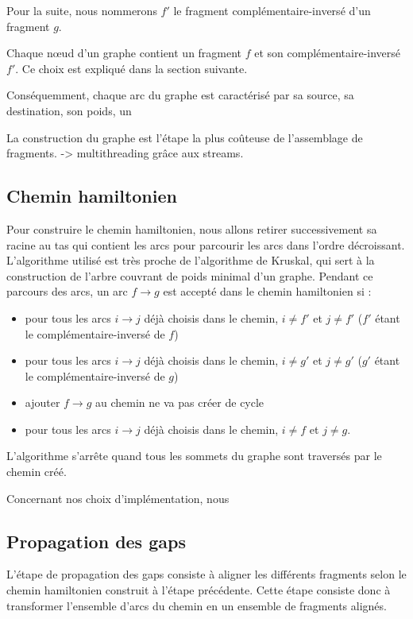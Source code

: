 \documentclass{article}
\begin{document}
Pour la suite, nous nommerons $f'$ le fragment complémentaire-inversé d'un fragment $g$. 

Chaque nœud d'un graphe contient un fragment $f$ et son complémentaire-inversé $f'$. Ce choix est expliqué dans la section suivante.

Conséquemment, chaque arc du graphe est caractérisé par sa source, sa destination, son poids, un

La construction du graphe est l'étape la plus coûteuse de l'assemblage de fragments. -> multithreading grâce aux streams.



\subsection{Chemin hamiltonien}

Pour construire le chemin hamiltonien, nous allons retirer successivement sa racine au tas qui contient les arcs pour parcourir les arcs dans l'ordre décroissant. L'algorithme utilisé est très proche de l'algorithme de Kruskal, qui sert à la construction de l'arbre couvrant de poids minimal d'un graphe.
Pendant ce parcours des arcs, un arc $f \to g$ est accepté dans le chemin hamiltonien si :

\begin{itemize}
\item pour tous les arcs $i \to j$ déjà choisis dans le chemin, $i \neq f'$ et $j \neq f'$  ($f'$ étant le complémentaire-inversé de $f$)
\item pour tous les arcs $i \to j$ déjà choisis dans le chemin, $i \neq g'$ et $j \neq g'$  ($g'$ étant le complémentaire-inversé de $g$)
\item ajouter $f \to g$ au chemin ne va pas créer de cycle
\item pour tous les arcs $i \to j$ déjà choisis dans le chemin, $i \neq f$ et $j \neq g$.
\end{itemize}

L'algorithme s'arrête quand tous les sommets du graphe sont traversés par le chemin créé.

Concernant nos choix d'implémentation, nous 

\subsection{Propagation des gaps}

L'étape de propagation des gaps consiste à aligner les différents fragments selon le chemin hamiltonien construit à l'étape précédente. Cette étape consiste donc à transformer l'ensemble d'arcs du chemin en un ensemble de fragments alignés. 
\end{document}
